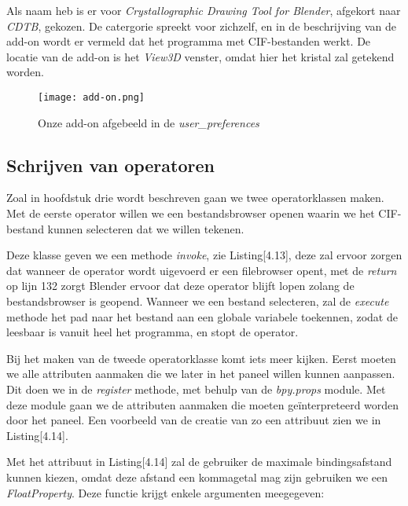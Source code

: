 Als naam heb is er voor \textit{Crystallographic Drawing Tool for Blender}, afgekort naar \textit{CDTB}, gekozen. De catergorie spreekt voor zichzelf, en in de beschrijving van de add-on wordt er vermeld dat het programma met CIF-bestanden werkt. De locatie van de add-on is het \textit{View3D} venster, omdat hier het kristal zal  getekend worden.

\begin{figure}[H]
\texttt{[image: add-on.png]}
\caption{Onze add-on afgebeeld in de \textit{user\_preferences}}
\end{figure}

\subsection{Schrijven van operatoren}

Zoal in hoofdstuk drie wordt beschreven gaan we twee operatorklassen maken. Met de eerste operator willen we een bestandsbrowser openen waarin we het CIF-bestand kunnen selecteren dat we willen tekenen. 



Deze klasse geven we een methode \textit{invoke}, zie Listing[4.13], deze zal ervoor zorgen dat wanneer de operator wordt uigevoerd er een filebrowser opent, met de \textit{return} op lijn 132 zorgt Blender ervoor dat deze operator blijft lopen zolang de bestandsbrowser is geopend. Wanneer we een bestand selecteren, zal de \textit{execute} methode het pad naar het bestand aan een globale variabele toekennen, zodat de leesbaar is vanuit heel het programma, en stopt de operator.
\par 
Bij het maken van de tweede operatorklasse komt iets meer kijken. Eerst moeten we alle attributen aanmaken die we later in het paneel willen kunnen aanpassen. Dit doen we in de \textit{register} methode, met behulp van de \textit{bpy.props} module. Met deze module gaan we de attributen aanmaken die moeten geïnterpreteerd worden door het paneel. Een voorbeeld van de creatie van zo een attribuut zien we in Listing[4.14].      



Met het attribuut in Listing[4.14] zal de gebruiker de maximale bindingsafstand kunnen kiezen, omdat deze afstand een kommagetal mag zijn gebruiken we een \textit{FloatProperty}. Deze functie krijgt enkele argumenten meegegeven:

